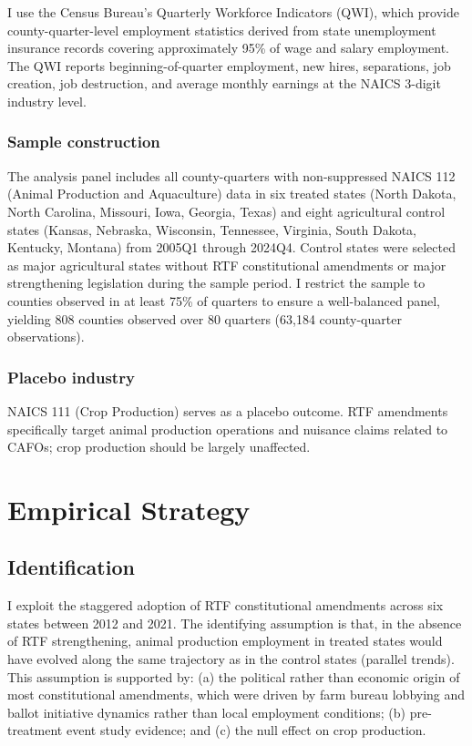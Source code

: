 \documentclass[12pt]{article}
\begin{document}
I use the Census Bureau's Quarterly Workforce Indicators (QWI), which provide county-quarter-level employment statistics derived from state unemployment insurance records covering approximately 95\% of wage and salary employment. The QWI reports beginning-of-quarter employment, new hires, separations, job creation, job destruction, and average monthly earnings at the NAICS 3-digit industry level.

\subsubsection*{Sample construction} The analysis panel includes all county-quarters with non-suppressed NAICS 112 (Animal Production and Aquaculture) data in six treated states (North Dakota, North Carolina, Missouri, Iowa, Georgia, Texas) and eight agricultural control states (Kansas, Nebraska, Wisconsin, Tennessee, Virginia, South Dakota, Kentucky, Montana) from 2005Q1 through 2024Q4. Control states were selected as major agricultural states without RTF constitutional amendments or major strengthening legislation during the sample period. I restrict the sample to counties observed in at least 75\% of quarters to ensure a well-balanced panel, yielding 808 counties observed over 80 quarters (63,184 county-quarter observations).

\subsubsection*{Placebo industry} NAICS 111 (Crop Production) serves as a placebo outcome. RTF amendments specifically target animal production operations and nuisance claims related to CAFOs; crop production should be largely unaffected.




\section{Empirical Strategy}
\label{sec:strategy}

\subsection{Identification}

I exploit the staggered adoption of RTF constitutional amendments across six states between 2012 and 2021. The identifying assumption is that, in the absence of RTF strengthening, animal production employment in treated states would have evolved along the same trajectory as in the control states (parallel trends). This assumption is supported by: (a) the political rather than economic origin of most constitutional amendments, which were driven by farm bureau lobbying and ballot initiative dynamics rather than local employment conditions; (b) pre-treatment event study evidence; and (c) the null effect on crop production.
\end{document}
